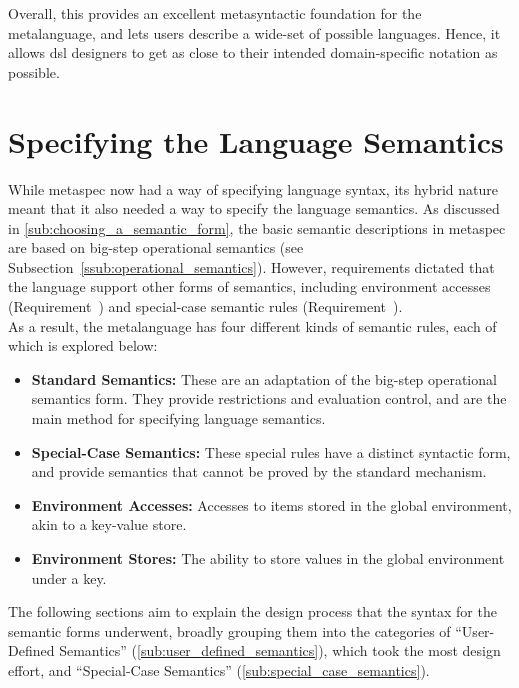 Overall, this provides an excellent metasyntactic foundation for the metalanguage, and lets users describe a wide-set of possible languages.
Hence, it allows \gls{dsl} designers to get as close to their intended domain-specific notation as possible. 



\section{Specifying the Language Semantics} %
\label{sec:specifying_the_language_semantics}
While \gls{metaspec} now had a way of specifying language syntax, its hybrid nature meant that it also needed a way to specify the language semantics. 
As discussed in \autoref{sub:choosing_a_semantic_form}, the basic semantic descriptions in metaspec are based on big-step operational semantics (see Subsection~\ref{ssub:operational_semantics}). 
However, requirements dictated that the language support other forms of semantics, including environment accesses (Requirement~) and special-case semantic rules (Requirement~).\\

As a result, the metalanguage has four different kinds of semantic rules, each of which is explored below:
\begin{itemize}
    \item \textbf{Standard Semantics:} These are an adaptation of the big-step operational semantics form.
    They provide restrictions and evaluation control, and are the main method for specifying language semantics.
    \item \textbf{Special-Case Semantics:} These special rules have a distinct syntactic form, and provide semantics that cannot be proved by the standard mechanism.
    \item \textbf{Environment Accesses:} Accesses to items stored in the global environment, akin to a key-value store.
    \item \textbf{Environment Stores:} The ability to store values in the global environment under a key. 
\end{itemize}

The following sections aim to explain the design process that the syntax for the semantic forms underwent, broadly grouping them into the categories of ``User-Defined Semantics'' (\autoref{sub:user_defined_semantics}), which took the most design effort, and ``Special-Case Semantics'' (\autoref{sub:special_case_semantics}).

